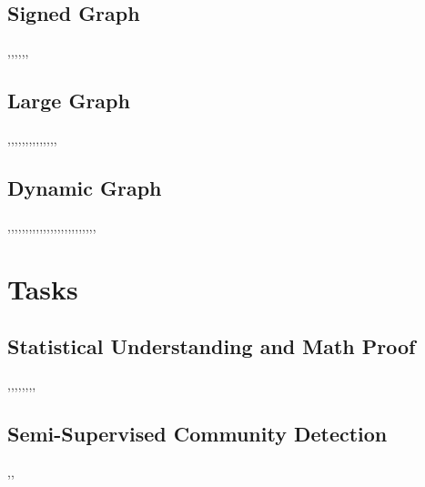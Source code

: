 \subsection{Signed Graph}
\cite{liu2014multiobjective},\cite{zhao2017statistical},\cite{costantini2014generalization},\cite{knyazev2017signed},\cite{kunegis2010spectral},\cite{cai2014discrete},\cite{li2014comparative} 

\subsection{Large Graph}
\cite{peixoto2014hierarchical},\cite{blondel2008fast},\cite{clauset2004finding},\cite{leskovec2009community},\cite{zheng2017finding},\cite{basuchowdhuri2019fast},\cite{amini2013pseudo},\cite{huang2011towards},\cite{ruan2013efficient},\cite{bo2010spectral},\cite{vsubelj2011unfolding},\cite{de2011generalized},\cite{jiang2013efficient},\cite{jiang2014efficient},

\subsection{Dynamic Graph}
\cite{lin2008facetnet},\cite{chi2007evolutionary},\cite{mucha2010community},\cite{ronhovde2011detecting},\cite{nguyen2011overlapping},\cite{bassett2013robust},\cite{bazzi2016community},\cite{ren2014epidemic},\cite{shao2015community},\cite{he2012discovering},\cite{delvenne2013stability},\cite{schaub2012encoding},\cite{chen2012community},\cite{cazabet2010detection},\cite{xu2011tracking},\cite{xie2013labelrankt},\cite{greene2010tracking},\cite{takaffoli2011community},\cite{alvari2014community},\cite{cheng2010uncovering},\cite{dinh2013adaptive},\cite{takaffoli2013incremental},\cite{baingana2015joint},\cite{ho2011evolving},\cite{gupta2011evolutionary},


\section{Tasks}
\subsection{Statistical Understanding and Math Proof}
\cite{newman2016equivalence},\cite{massoulie2014community},\cite{abbe2015detection},\cite{moitra2016robust},\cite{newman2015generalized},\cite{gleich2012vertex},\cite{mossel2018proof},\cite{mossel2014consistency},\cite{ailon2013breaking}

\subsection{Semi-Supervised Community Detection}
\cite{kloumann2014community},\cite{whang2013overlapping},

